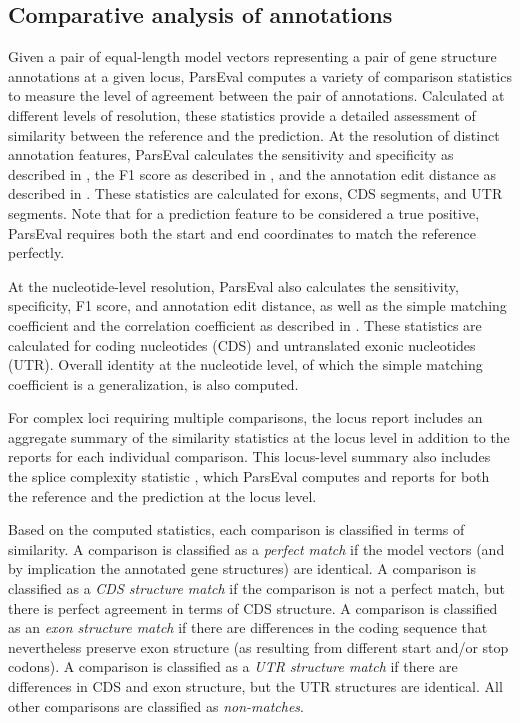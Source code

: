 \subsection{Comparative analysis of annotations}
Given a pair of equal-length model vectors representing a pair of gene structure annotations at a given locus, ParsEval computes a variety of comparison statistics to measure the level of agreement between the pair of annotations.
Calculated at different levels of resolution, these statistics provide a detailed assessment of similarity between the reference and the prediction.
At the resolution of distinct annotation features, ParsEval calculates the sensitivity and specificity as described in  \citep{Burset}, the F1 score as described in  \citep{Zhao}, and the annotation edit distance as described in  \citep{Eilbeck,Holt}.
These statistics are calculated for exons, CDS segments, and UTR segments.
Note that for a prediction feature to be considered a true positive, ParsEval requires both the start and end coordinates to match the reference perfectly.

At the nucleotide-level resolution, ParsEval also calculates the sensitivity, specificity, F1 score, and annotation edit distance, as well as the simple matching coefficient and the correlation coefficient as described in  \citep{Burset}.
These statistics are calculated for coding nucleotides (CDS) and untranslated exonic nucleotides (UTR).
Overall identity at the nucleotide level, of which the simple matching coefficient is a generalization, is also computed.

For complex loci requiring multiple comparisons, the locus report includes an aggregate summary of the similarity statistics at the locus level in addition to the reports for each individual comparison.
This locus-level summary also includes the splice complexity statistic \citep{Eilbeck}, which ParsEval computes and reports for both the reference and the prediction at the locus level.

Based on the computed statistics, each comparison is classified in terms of similarity.
A comparison is classified as a \emph{perfect match} if the model vectors (and by implication the annotated gene structures) are identical.
A comparison is classified as a \emph{CDS structure match} if the comparison is not a perfect match, but there is perfect agreement in terms of CDS structure.
A comparison is classified as an \emph{exon structure match} if there are differences in the coding sequence that nevertheless preserve exon structure (as resulting from different start and/or stop codons).
A comparison is classified as a \emph{UTR structure match} if there are differences in CDS and exon structure, but the UTR structures are identical.
All other comparisons are classified as \emph{non-matches}.

